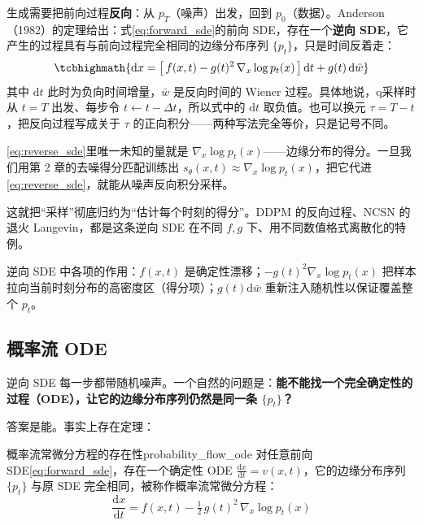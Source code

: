 生成需要把前向过程\textbf{反向}：从 $p_T$（噪声）出发，回到 $p_0$（数据）。Anderson（1982）的定理给出：式\eqref{eq:forward_sde}的前向 SDE，存在一个\textbf{逆向 SDE}，它产生的过程具有与前向过程完全相同的边缘分布序列 $\{p_t\}$，只是时间反着走：
\begin{equation}\label{eq:reverse_sde}
\tcbhighmath{
\mathrm{d}x = \big[\,f(x,t) - g(t)^2\,\nabla_x\log p_t(x)\,\big]\,\mathrm{d}t + g(t)\,\mathrm{d}\bar w
}
\end{equation}
其中 $\mathrm{d}t$ 此时为负向时间增量，$\bar w$ 是反向时间的 Wiener 过程。具体地说，q采样时从 $t=T$ 出发、每步令 $t\leftarrow t-\Delta t$，所以式中的 $\mathrm dt$ 取负值。也可以换元 $\tau = T-t$，把反向过程写成关于 $\tau$ 的正向积分——两种写法完全等价，只是记号不同。

\eqref{eq:reverse_sde}里唯一未知的量就是 $\nabla_x\log p_t(x)$——边缘分布的得分。一旦我们用第 2 章的去噪得分匹配训练出 $s_\theta(x,t)\approx\nabla_x\log p_t(x)$，把它代进\eqref{eq:reverse_sde}，就能从噪声反向积分采样。

这就把“采样”彻底归约为“估计每个时刻的得分”。DDPM 的反向过程、NCSN 的退火 Langevin，都是这条逆向 SDE 在不同 $f,g$ 下、用不同数值格式离散化的特例。

逆向 SDE 中各项的作用：$f(x,t)$ 是确定性漂移；$-g(t)^2\nabla_x\log p_t(x)$ 把样本拉向当前时刻分布的高密度区（得分项）；$g(t)\mathrm{d}\bar w$ 重新注入随机性以保证覆盖整个 $p_t$。

\subsection{概率流 ODE}

逆向 SDE 每一步都带随机噪声。一个自然的问题是：\textbf{能不能找一个完全确定性的过程（ODE），让它的边缘分布序列仍然是同一条 $\{p_t\}$？} 


答案是能。事实上存在定理：
\begin{theorem}{概率流常微分方程的存在性}{probability_flow_ode}
    对任意前向 SDE\eqref{eq:forward_sde}，存在一个确定性 ODE $\frac{\mathrm dx}{\mathrm dt}=v(x,t)$，它的边缘分布序列 $\{p_t\}$ 与原 SDE 完全相同，被称作概率流常微分方程\cite{song2021scorebasedgenerativemodelingstochastic}：
\begin{equation}\label{eq:probability_flow_ode}
\frac{\mathrm{d}x}{\mathrm{d}t} = f(x,t) - \tfrac12\,g(t)^2\,\nabla_x\log p_t(x)
\end{equation}
\end{theorem}

